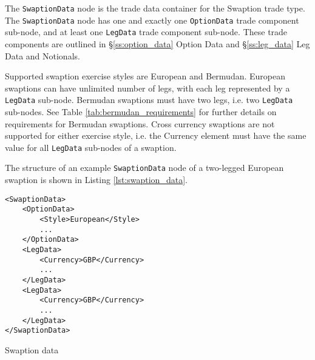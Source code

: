 The \lstinline!SwaptionData!  node is the trade data container for the Swaption trade type. The \lstinline!SwaptionData!  node has one and exactly one \lstinline!OptionData! trade component sub-node, and at least one \lstinline!LegData! trade component sub-node.  These trade components are outlined in \S \ref{ss:option_data} Option Data and \S \ref{ss:leg_data} Leg Data and Notionals.

Supported swaption exercise styles are European and Bermudan. European swaptions can have unlimited number of legs, with each leg represented by a \lstinline!LegData! sub-node. Bermudan swaptions must have two legs, i.e. two \lstinline!LegData! sub-nodes. See Table \ref{tab:bermudan_requirements} for further details on requirements for Bermudan swaptions. Cross currency swaptions are not supported for either exercise style, i.e. the Currency element must have the same value for all \lstinline!LegData! sub-nodes of a swaption.

The structure of an example \lstinline!SwaptionData!  node of a two-legged European swaption is shown in Listing \ref{lst:swaption_data}.  

\begin{listing}[H]
\begin{verbatim}
<SwaptionData>
    <OptionData>
        <Style>European</Style>
        ...
    </OptionData>
    <LegData>
        <Currency>GBP</Currency>
        ...
    </LegData>
    <LegData>
        <Currency>GBP</Currency>
        ...
    </LegData>
</SwaptionData>
\end{verbatim}
\caption{Swaption data}
\label{lst:swaption_data}
\end{listing}

